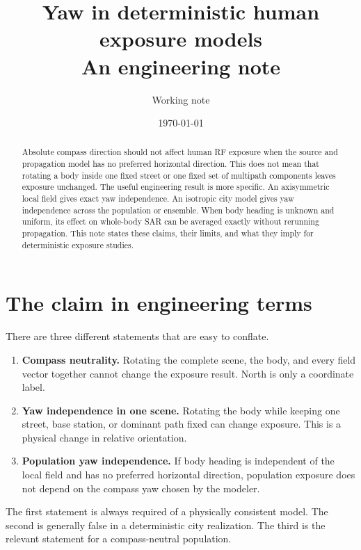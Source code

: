 \documentclass[11pt]{article}
\title{Yaw in deterministic human exposure models\\
\large An engineering note}
\author{Working note}
\date{\today}
\begin{document}
\maketitle

\begin{abstract}
Absolute compass direction should not affect human RF exposure when the source
and propagation model has no preferred horizontal direction. This does not mean
that rotating a body inside one fixed street or one fixed set of multipath
components leaves exposure unchanged. The useful engineering result is more
specific. An axisymmetric local field gives exact yaw independence. An
isotropic city model gives yaw independence across the population or ensemble.
When body heading is unknown and uniform, its effect on whole-body SAR can be
averaged exactly without rerunning propagation. This note states these claims,
their limits, and what they imply for deterministic exposure studies.
\end{abstract}

\section{The claim in engineering terms}

There are three different statements that are easy to conflate.

\begin{enumerate}
  \item \textbf{Compass neutrality.} Rotating the complete scene, the body, and
  every field vector together cannot change the exposure result. North is only
  a coordinate label.

  \item \textbf{Yaw independence in one scene.} Rotating the body while keeping
  one street, base station, or dominant path fixed can change exposure. This is
  a physical change in relative orientation.

  \item \textbf{Population yaw independence.} If body heading is independent of
  the local field and has no preferred horizontal direction, population
  exposure does not depend on the compass yaw chosen by the modeler.
\end{enumerate}

The first statement is always required of a physically consistent model. The
second is generally false in a deterministic city realization. The third is
the relevant statement for a compass-neutral population.
\end{document}
